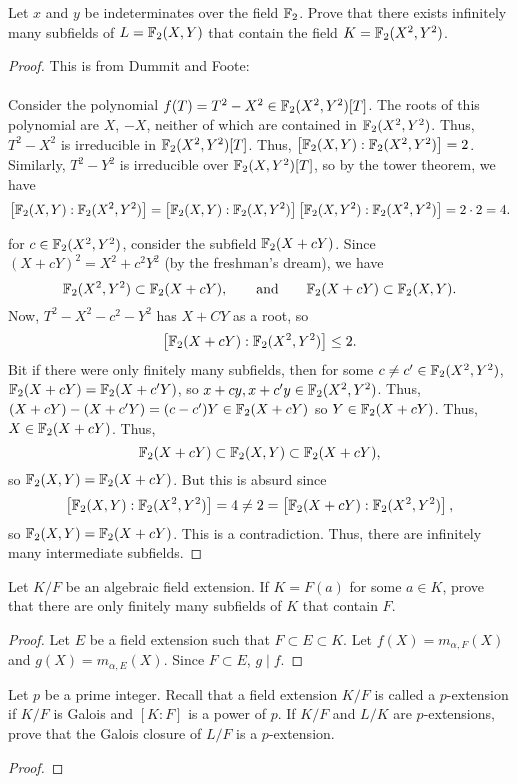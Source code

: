 \begin{problem}
Let $x$ and $y$ be indeterminates over the field $\mathbb{F}_2$. Prove that there
exists infinitely many subfields of $L=\mathbb{F}_2(X,Y)$ that contain the field
$K=\mathbb{F}_2(X^2,Y^2)$.
\end{problem}
\begin{proof}
This is from Dummit and Foote:
\\\\
Consider the polynomial $f(T)=T^2-X^2\in\mathbb{F}_2(X^2,Y^2)[T]$. The roots of
this polynomial are $X$, $-X$, neither of which are contained in
$\mathbb{F}_2(X^2,Y^2)$. Thus, $T^2-X^2$ is irreducible in
$\mathbb{F}_2(X^2,Y^2)[T]$. Thus,
$\left[\mathbb{F}_2(X,Y):\mathbb{F}_2(X^2,Y^2)\right]=2$. Similarly, $T^2-Y^2$ is
irreducible over $\mathbb{F}_2(X,Y^2)[T]$, so by the tower theorem, we have
\[
\left[\mathbb{F}_2(X,Y):\mathbb{F}_2(X^2,Y^2)\right]=\left[\mathbb{F}_2(X,Y):\mathbb{F}_2(X,Y^2)\right]\left[\mathbb{F}_2(X,Y^2):\mathbb{F}_2(X^2,Y^2)\right]=2\cdot 2=4.
\]

for $c\in\mathbb{F}_2(X^2,Y^2)$, consider the subfield $\mathbb{F}_2(X+cY)$. Since
$(X+cY)^2=X^2+c^2Y^2$ (by the freshman's dream), we have
\[
\mathbb{F}_2(X^2,Y^2)\subset\mathbb{F}_2(X+cY),\qquad\text{and}\qquad
\mathbb{F}_2(X+cY)\subset\mathbb{F}_2(X,Y).
\]
Now, $T^2-X^2-c^2-Y^2$ has $X+CY$ as a root, so
\[
\left[\mathbb{F}_2(X+cY):\mathbb{F}_2(X^2,Y^2)\right]\leq 2.
\]
Bit if there were only finitely many subfields, then for some $c\neq
c'\in\mathbb{F}_2(X^2,Y^2)$, $\mathbb{F}_2(X+cY)=\mathbb{F}_2(X+c'Y)$, so
$x+cy,x+c'y\in\mathbb{F}_2(X^2,Y^2)$. Thus,
$(X+cY)-(X+c'Y)=(c-c')Y\in\mathbb{F}_2(X+cY)$ so $Y\in\mathbb{F}_2(X+cY)$. Thus,
$X\in\mathbb{F}_2(X+cY)$. Thus,
\[
\mathbb{F}_2(X+cY)\subset\mathbb{F}_2(X,Y)\subset\mathbb{F}_2(X+cY),
\]
so $\mathbb{F}_2(X,Y)=\mathbb{F}_2(X+cY)$. But this is absurd since
\[
\left[\mathbb{F}_2(X,Y):\mathbb{F}_2(X^2,Y^2)\right]=4\neq 2=
\left[\mathbb{F}_2(X+cY):\mathbb{F}_2(X^2,Y^2)\right],
\]
so $\mathbb{F}_2(X,Y)=\mathbb{F}_2(X+cY)$. This is a contradiction. Thus, there are
infinitely many intermediate subfields.
\end{proof}

\begin{problem}
Let $K/F$ be an algebraic field extension. If $K=F(a)$ for some $a\in K$,
prove that there are only finitely many subfields of $K$ that contain $F$.
\end{problem}
\begin{proof}
Let $E$ be a field extension such that $F\subset E\subset K$. Let
$f(X)=m_{\alpha,F}(X)$ and $g(X)=m_{\alpha,E}(X)$. Since $F\subset E$,
$g\mid f$.
\end{proof}

\begin{problem}
Let $p$ be a prime integer. Recall that a field extension $K/F$ is called a
$p$-extension if $K/F$ is Galois and $[K:F]$ is a power of $p$. If $K/F$
and $L/K$ are $p$-extensions, prove that the Galois closure of $L/F$ is a
$p$-extension.
\end{problem}
\begin{proof}
\end{proof}

